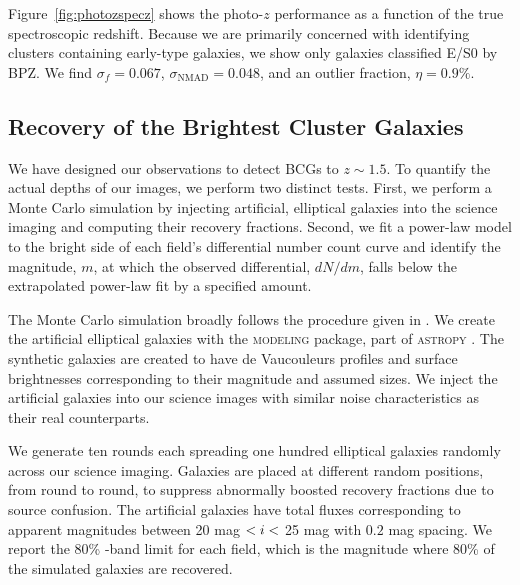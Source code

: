 \documentclass[apj, revtex4-1]{emulateapj}
\begin{document}
Figure~\ref{fig:photozspecz} shows the photo-$z$ performance as a function of the true spectroscopic redshift. Because we are primarily concerned with identifying clusters containing early-type galaxies, we show only galaxies classified E/S0 by BPZ. We find $\sigma_f = 0.067$, $\sigma_\mathrm{NMAD} = 0.048$, and an outlier fraction, $\eta = 0.9\%$.

\subsection{Recovery of the Brightest Cluster Galaxies}\label{sec:cluster finding}
We have designed our observations to detect BCGs to $z\sim1.5$. To quantify the actual depths of our images, we perform two distinct tests. First, we perform a Monte Carlo simulation by injecting artificial, elliptical galaxies into the science imaging and computing their recovery fractions. Second, we fit a power-law model to the bright side of each field's differential number count curve and identify the magnitude, $m$, at which  the observed differential, $dN/dm$, falls below the extrapolated power-law fit by a specified amount.

The Monte Carlo simulation broadly follows the procedure given in \cite{Menanteau2010a}. We create the artificial elliptical galaxies with the \textsc{modeling} package, part of \textsc{astropy} \citep{TheAstropyCollaboration2013}. The synthetic galaxies are created to have de Vaucouleurs \citep{DeVaucouleurs1948} profiles and surface brightnesses corresponding to their magnitude and assumed sizes. We inject the artificial galaxies into our science images with similar noise characteristics as their real counterparts.

We generate ten rounds each spreading one hundred elliptical galaxies randomly across our science imaging. Galaxies are placed at different random positions, from round to round, to suppress abnormally boosted recovery fractions due to source confusion. The artificial galaxies have total fluxes corresponding to apparent magnitudes between 20 mag $< \hbox{$i$} <$ 25 mag with $0.2$ mag spacing. We report the 80\% \sdssi-band limit for each field, which is the magnitude where 80\% of the simulated galaxies are recovered.
\end{document}
